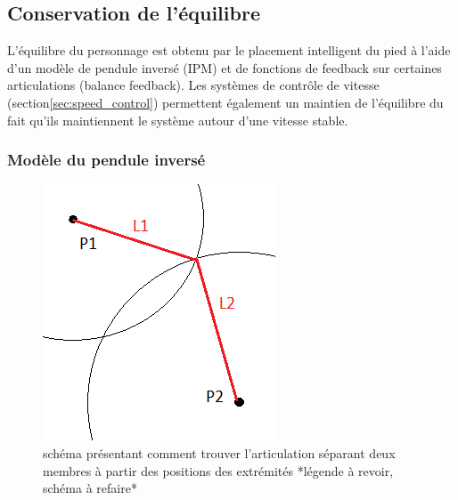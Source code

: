 \documentclass{llncs}
\begin{document}
\subsection{Conservation de l'équilibre}
%
L'équilibre du personnage est obtenu par le placement intelligent du pied à l'aide d'un modèle de pendule inversé (IPM) et de fonctions de feedback sur certaines articulations (balance feedback). Les systèmes de contrôle de vitesse (section\ref{sec:speed_control}) permettent également un maintien de l'équilibre du fait qu'ils maintiennent le système autour d'une vitesse stable. 
%
\subsubsection{Modèle du pendule inversé}
%
\label{sec:IPM}

\begin{figure}[h]
\centering
\includegraphics[scale=0.5]{inv_kin_basic.png}
\caption{schéma présentant comment trouver l'articulation séparant deux membres à partir des positions des extrémités *légende à revoir, schéma à refaire*}
\label{fig:inv_kin}
\end{figure}
\end{document}
